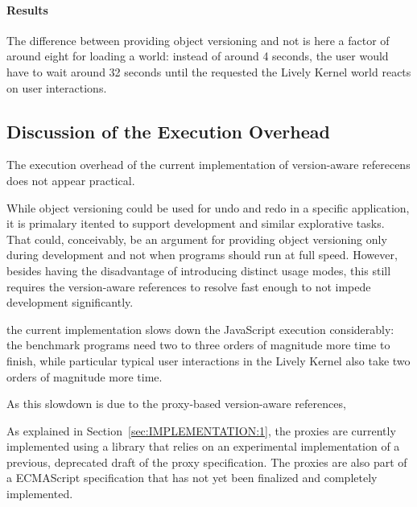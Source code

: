 \paragraph{Results}
The difference between providing object versioning and not is here a factor of around eight for loading a world: instead of around 4 seconds, the user would have to wait around 32 seconds until the requested the Lively Kernel world reacts on user interactions.





\subsection{Discussion of the Execution Overhead}






The execution overhead of the current implementation of version-aware referecens does not appear practical.



While object versioning could be used for undo and redo in a specific application, it is primalary itented to support development and similar explorative tasks.
That could, conceivably, be an argument for providing object versioning only during development and not when programs should run at full speed.
However, besides having the disadvantage of introducing distinct usage modes, this still requires the version-aware references to resolve fast enough to not impede development significantly.




the current implementation slows down the JavaScript execution considerably: the benchmark programs need two to three orders of magnitude more time to finish, while particular typical user interactions in the Lively Kernel also take two orders of magnitude more time.


As this slowdown is due to the proxy-based version-aware references,

As explained in Section~\ref{sec:IMPLEMENTATION:1}, the proxies are currently implemented using a library that relies on an experimental implementation of a previous, deprecated draft of the proxy specification.
The proxies are also part of a ECMAScript specification that has not yet been finalized and completely implemented.



